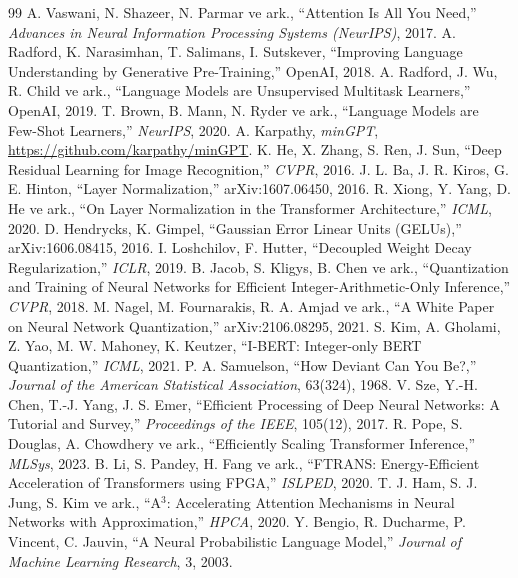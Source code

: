 \begin{thebibliography}{99}\small
\setlength{\itemsep}{3pt}
 A. Vaswani, N. Shazeer, N. Parmar ve ark., ``Attention Is All You Need,'' \emph{Advances in Neural Information Processing Systems (NeurIPS)}, 2017.
 A. Radford, K. Narasimhan, T. Salimans, I. Sutskever, ``Improving Language Understanding by Generative Pre-Training,'' OpenAI, 2018.
 A. Radford, J. Wu, R. Child ve ark., ``Language Models are Unsupervised Multitask Learners,'' OpenAI, 2019.
 T. Brown, B. Mann, N. Ryder ve ark., ``Language Models are Few-Shot Learners,'' \emph{NeurIPS}, 2020.
 A. Karpathy, \emph{minGPT}, \url{https://github.com/karpathy/minGPT}.
 K. He, X. Zhang, S. Ren, J. Sun, ``Deep Residual Learning for Image Recognition,'' \emph{CVPR}, 2016.
 J. L. Ba, J. R. Kiros, G. E. Hinton, ``Layer Normalization,'' arXiv:1607.06450, 2016.
 R. Xiong, Y. Yang, D. He ve ark., ``On Layer Normalization in the Transformer Architecture,'' \emph{ICML}, 2020.
 D. Hendrycks, K. Gimpel, ``Gaussian Error Linear Units (GELUs),'' arXiv:1606.08415, 2016.
 I. Loshchilov, F. Hutter, ``Decoupled Weight Decay Regularization,'' \emph{ICLR}, 2019.
 B. Jacob, S. Kligys, B. Chen ve ark., ``Quantization and Training of Neural Networks for Efficient Integer-Arithmetic-Only Inference,'' \emph{CVPR}, 2018.
 M. Nagel, M. Fournarakis, R. A. Amjad ve ark., ``A White Paper on Neural Network Quantization,'' arXiv:2106.08295, 2021.
 S. Kim, A. Gholami, Z. Yao, M. W. Mahoney, K. Keutzer, ``I-BERT: Integer-only BERT Quantization,'' \emph{ICML}, 2021.
 P. A. Samuelson, ``How Deviant Can You Be?,'' \emph{Journal of the American Statistical Association}, 63(324), 1968.
 V. Sze, Y.-H. Chen, T.-J. Yang, J. S. Emer, ``Efficient Processing of Deep Neural Networks: A Tutorial and Survey,'' \emph{Proceedings of the IEEE}, 105(12), 2017.
 R. Pope, S. Douglas, A. Chowdhery ve ark., ``Efficiently Scaling Transformer Inference,'' \emph{MLSys}, 2023.
 B. Li, S. Pandey, H. Fang ve ark., ``FTRANS: Energy-Efficient Acceleration of Transformers using FPGA,'' \emph{ISLPED}, 2020.
 T. J. Ham, S. J. Jung, S. Kim ve ark., ``A$^3$: Accelerating Attention Mechanisms in Neural Networks with Approximation,'' \emph{HPCA}, 2020.
 Y. Bengio, R. Ducharme, P. Vincent, C. Jauvin, ``A Neural Probabilistic Language Model,'' \emph{Journal of Machine Learning Research}, 3, 2003.

\end{thebibliography}
